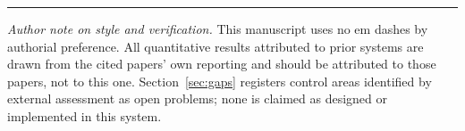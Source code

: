 \documentclass[11pt,letterpaper]{article}
\begin{document}
\vspace{1em}
\hrule
\vspace{0.6em}
{\footnotesize\noindent\emph{Author note on style and verification.} This manuscript uses no em dashes by authorial preference. All quantitative results attributed to prior systems are drawn from the cited papers' own reporting and should be attributed to those papers, not to this one. Section~\ref{sec:gaps} registers control areas identified by external assessment as open problems; none is claimed as designed or implemented in this system.\par}
\end{document}
